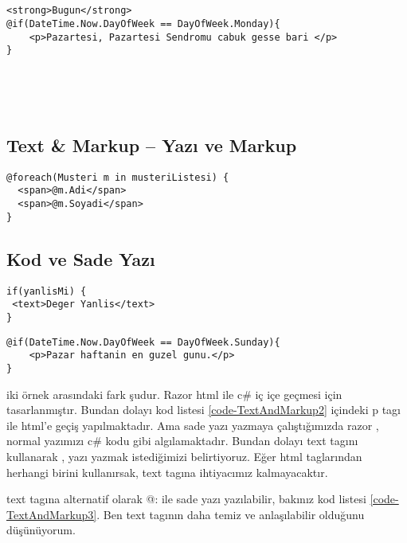 \documentclass[10pt,a4paper]{article}
\begin{document}
\begin{lstlisting}[label=code-ConditionalVariableExample1,caption=Durum Kontrol Örnek - if]


<strong>Bugun</strong>
@if(DateTime.Now.DayOfWeek == DayOfWeek.Monday){
    <p>Pazartesi, Pazartesi Sendromu cabuk gesse bari </p>
}





\end{lstlisting}



\subsection{Text \& Markup -- Yazı ve Markup}

\begin{lstlisting}[label=code-TextAndMarkup,caption=Yazı ve Markup]
@foreach(Musteri m in musteriListesi) {
  <span>@m.Adi</span> 
  <span>@m.Soyadi</span> 
}
\end{lstlisting}


\subsection{Kod ve Sade Yazı}


\begin{lstlisting}[label=code-TextAndMarkup1,caption=Yazı ve Markup 1 text tag]
if(yanlisMi) {
 <text>Deger Yanlis</text>
}
\end{lstlisting}

\begin{lstlisting}[label=code-TextAndMarkup2,caption=Yazı ve Markup 2]
@if(DateTime.Now.DayOfWeek == DayOfWeek.Sunday){
    <p>Pazar haftanin en guzel gunu.</p>
}\end{lstlisting}


iki örnek arasındaki fark şudur. 
Razor html ile c\# iç içe geçmesi için tasarlanmıştır.
Bundan dolayı kod listesi \ref{code-TextAndMarkup2} içindeki p tagı ile html'e geçiş yapılmaktadır.
Ama sade yazı yazmaya çalıştığımızda razor , normal yazımızı c\# kodu gibi algılamaktadır.
Bundan dolayı text tagını kullanarak , yazı yazmak istediğimizi belirtiyoruz.
Eğer html taglarından herhangi birini kullanırsak, text tagına ihtiyacımız kalmayacaktır.


text tagına alternatif olarak @: ile sade yazı yazılabilir, bakınız kod listesi \ref{code-TextAndMarkup3}.
Ben text tagının daha temiz ve anlaşılabilir olduğunu düşünüyorum.
\end{document}
